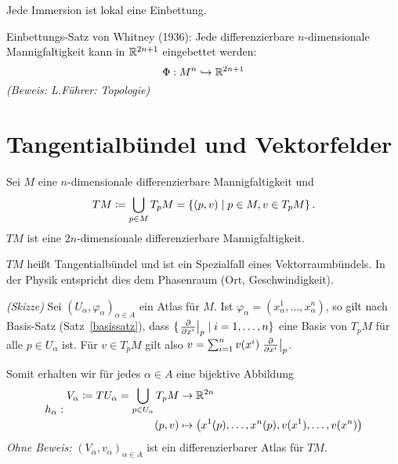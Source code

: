 \documentclass[a4paper,twoside,DIV15,BCOR12mm]{scrbook}
\begin{document}
\begin{bemerkungen}
\item Jede Immersion ist lokal eine Einbettung.
\item Einbettungs-Satz von Whitney (1936): Jede differenzierbare $n$-dimensionale Mannigfaltigkeit kann in $\mathbb{R}^{2n+1}$ eingebettet werden:
\[
\Phi: M^n \hookrightarrow \mathbb{R}^{2n+1}
\]
\emph{(Beweis: L.Führer: Topologie)}
\end{bemerkungen}

\section{Tangentialbündel und Vektorfelder}

\begin{satz}[Tangentialbündel]
Sei $M$ eine $n$-dimensionale differenzierbare Mannigfaltigkeit und 
\[TM \da \bigcup_{p\in M} T_pM = \{(p,v)\mid p\in M, v\in T_pM\}\,.\]
$TM$ ist eine $2n$-dimensionale differenzierbare Mannigfaltigkeit.
\label{satz3}
\end{satz}
$TM$ heißt Tangentialbündel und ist ein Spezialfall eines Vektorraumbündels. In der Physik entspricht dies dem Phasenraum (Ort, Geschwindigkeit).

\begin{beweis}
\emph{(Skizze)} Sei $(U_\alpha, \varphi_\alpha)_{\alpha \in A}$ ein Atlas für $M$. Ist $\varphi_\alpha = (x_\alpha^1,\ldots, x_\alpha^n)$, so gilt nach Basis-Satz (\mbox{Satz \ref{basissatz}}), dass $\{\left.\frac{\partial}{\partial x^{i}}\right|_p \mid i = 1,\ldots,n\}$ eine Basis von $T_pM$ für alle $p \in U_\alpha$ ist. Für $v\in T_pM$ gilt also $v= \sum_{i=1}^n v(x^i)\left.\frac{\partial}{\partial x^{i}}\right|_p$.

Somit erhalten wir für jedes $\alpha\in A$ eine bijektive Abbildung 
\[
h_\alpha:
\begin{aligned}
V_\alpha \da TU_\alpha = \bigcup_{p\in U_\alpha} T_pM &\to \MdR^{2n} \\
(p,v) &\mapsto \big(x^1(p), \ldots, x^n(p), v(x^1), \ldots, v(x^n)\big)
\end{aligned}
\]
\emph{Ohne Beweis:} $(V_\alpha, v_\alpha)_{\alpha\in A}$ ist ein differenzierbarer Atlas für $TM$.
\end{beweis}
\end{document}
